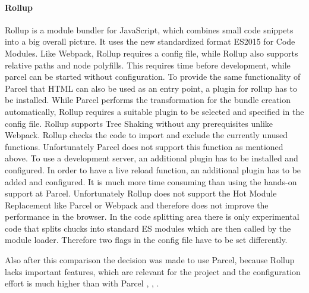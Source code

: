 \paragraph{Rollup}
\label{par:tecRollup}
Rollup is a module bundler for JavaScript, which combines small code snippets into a big overall picture. It uses the new standardized format ES2015 for Code Modules. Like Webpack, Rollup requires a config file, while Rollup also supports relative paths and node polyfills. This requires time before development, while parcel can be started without configuration. To provide the same functionality of Parcel that HTML can also be used as an entry point, a plugin for rollup has to be installed. While Parcel performs the transformation for the bundle creation automatically, Rollup requires a suitable plugin to be selected and specified in the config file.  Rollup supports Tree Shaking without any prerequisites unlike Webpack. Rollup checks the code to import and exclude the currently unused functions. Unfortunately Parcel does not support this function as mentioned above. To use a development server, an additional plugin has to be installed and configured. In order to have a live reload function, an additional plugin has to be added and configured. It is much more time consuming than using the hands-on support at Parcel. Unfortunately Rollup does not support the Hot Module Replacement like Parcel or Webpack and therefore does not improve the performance in the browser. In the code splitting area there is only experimental code that splits chucks into standard ES modules which are then called by the module loader. Therefore two flags in the config file have to be set differently.

Also after this comparison the decision was made to use Parcel, because Rollup lacks important features, which are relevant for the project and the configuration effort is much higher than with Parcel \cite{Bhatia2018}, \cite{WebpackAuthors2019}, \cite{rollupJs-Authors2019}. 

